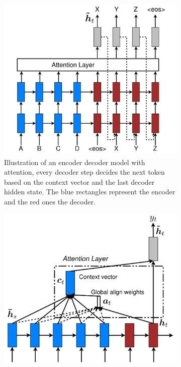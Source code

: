 \begin{figure}
\centering
\begin{subfigure}{.5\textwidth}
  \centering
  \includegraphics[width=1\linewidth]{figuras/luong1.png}
  \caption{Illustration of an encoder decoder model with attention, every decoder step decides the next token based on the context vector and the last decoder hidden state. The blue rectangles represent the encoder and the red ones the decoder.}
  \label{img:luong1}
\end{subfigure}
\begin{subfigure}{.75\textwidth}
  \centering
  \includegraphics[width=1\linewidth]{figuras/luong2.png}

\end{subfigure}
\end{figure}
